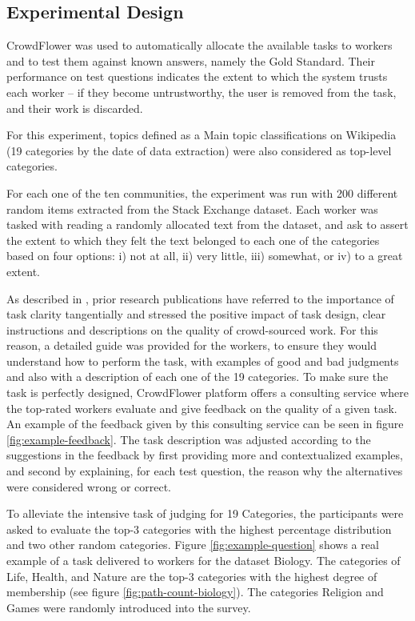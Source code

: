 \subsection{\hspace*{3pt} Experimental Design}

CrowdFlower was used to automatically allocate the available tasks to workers and to test them against known answers, namely the Gold Standard. Their performance on test questions indicates the extent to which the system trusts each worker -- if they become untrustworthy, the user is removed from the task, and their work is discarded.

For this experiment, topics defined as a Main topic classifications on Wikipedia (19 categories by the date of data extraction) were also considered as top-level categories. 

For each one of the ten communities, the experiment was run with 200 different random items extracted from the Stack Exchange dataset. Each worker was tasked with reading a randomly allocated text from the dataset, and ask to assert the extent to which they felt the text belonged to each one of the categories based on four options: i) not at all, ii) very little, iii) somewhat, or iv) to a great extent. 

As described in \cite{Gadiraju:2017}, prior research publications have referred to the importance of task clarity tangentially and stressed the positive impact of task design, clear instructions and descriptions on the quality of crowd-sourced work. For this reason, a detailed guide was provided for the workers, to ensure they would understand how to perform the task, with examples of good and bad judgments and also with a description of each one of the 19 categories. To make sure the task is perfectly designed, CrowdFlower platform offers a consulting service where the top-rated workers evaluate and give feedback on the quality of a given task. An example of the feedback given by this consulting service can be seen in figure \ref{fig:example-feedback}. The task description was adjusted according to the suggestions in the feedback by first providing more and contextualized examples, and second by explaining, for each test question, the reason why the alternatives were considered wrong or correct.  

To alleviate the intensive task of judging for 19 Categories, the participants were asked to evaluate the top-3 categories with the highest percentage distribution and two other random categories.  Figure \ref{fig:example-question} shows a real example of a task delivered to workers for the dataset Biology. The categories of Life, Health, and Nature are the top-3 categories with the highest degree of membership (see figure \ref{fig:path-count-biology}). The categories Religion and Games were randomly introduced into the survey. 

